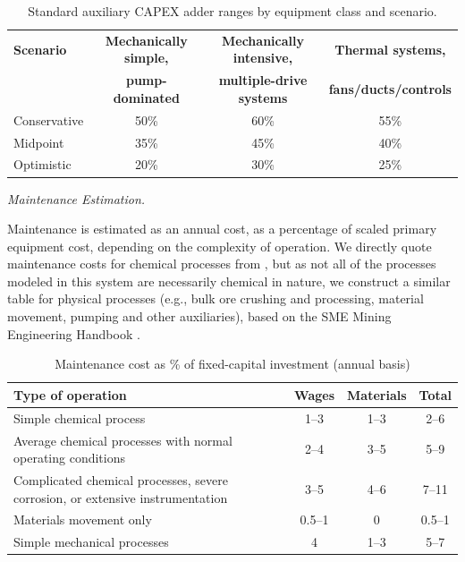 \documentclass{article}
\renewcommand\_{\textunderscore\allowbreak}
\begin{document}
\begin{table}[h]
\centering
\caption{Standard auxiliary CAPEX adder ranges by equipment class and scenario.}
\label{tab:c-capex-adders}
\begin{tabular}{lccc}
\hline
\textbf{Scenario} & \textbf{Mechanically simple,} & \textbf{Mechanically intensive,} & \textbf{Thermal systems,} \\
                  & \textbf{pump-dominated}       & \textbf{multiple-drive systems}  & \textbf{fans/ducts/controls} \\
\hline
Conservative & 50\% & 60\% & 55\% \\
Midpoint     & 35\% & 45\% & 40\% \\
Optimistic   & 20\% & 30\% & 25\% \\
\hline
\end{tabular}
\end{table}

\medskip
\noindent\textit{Maintenance Estimation.}\quad

Maintenance is estimated as an annual cost, as a percentage of scaled primary equipment cost, depending on the complexity of operation. We directly quote maintenance costs for chemical processes from \citet{petersPlantDesignEconomics1991}, but as not all of the processes modeled in this system are necessarily chemical in nature, we construct a similar table for physical processes (e.g., bulk ore crushing and processing, material movement, pumping and other auxiliaries), based on the SME Mining Engineering Handbook \citep{darlingSMEMiningEngineering2011}. 

\begin{table}[h]
\centering
\caption{Maintenance cost as \% of fixed-capital investment (annual basis)}
\label{tab:c-maintenace-fraction}
\begin{tabular}{p{7cm}ccc}
\hline
\textbf{Type of operation} & \textbf{Wages} & \textbf{Materials} & \textbf{Total} \\
\hline
Simple chemical process & 1--3 & 1--3 & 2--6 \\
Average chemical processes with normal operating conditions & 2--4 & 3--5 & 5--9 \\
Complicated chemical processes, severe corrosion, or extensive instrumentation & 3--5 & 4--6 & 7--11 \\
Materials movement only & 0.5--1 & 0 & 0.5--1 \\
Simple mechanical processes & 4 & 1--3 & 5--7 \\
\hline
\end{tabular}
\end{table}
\end{document}

